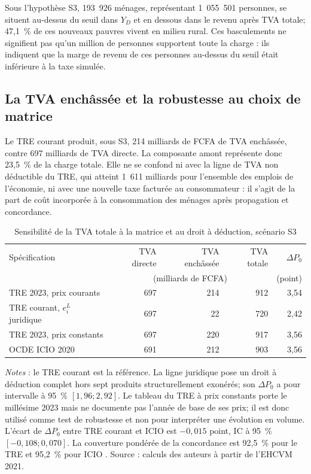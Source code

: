 \documentclass[11pt,a4paper]{article}
\begin{document}
Sous l'hypothèse S3, 193~926 ménages, représentant 1~055~501
personnes, se situent au-dessus du seuil dans $Y_D$ et en dessous dans le revenu
après TVA totale; 47,1~\% de ces nouveaux pauvres vivent en milieu rural. Ces
basculements ne signifient pas qu'un million de personnes supportent toute la
charge : ils indiquent que la marge de revenu de ces personnes au-dessus du
seuil était inférieure à la taxe simulée.

\subsection{La TVA enchâssée et la robustesse au choix de matrice}

Le TRE courant produit, sous S3, 214 milliards de FCFA de TVA enchâssée, contre
697 milliards de TVA directe. La composante amont représente donc 23,5~\% de la
charge totale. Elle ne se confond ni avec la ligne de TVA non déductible du TRE,
qui atteint 1~611 milliards pour l'ensemble des emplois de l'économie, ni avec
une nouvelle taxe facturée au consommateur : il s'agit de la part de coût
incorporée à la consommation des ménages après propagation et concordance.

\begin{table}[t]
\centering
\begin{threeparttable}
\caption{Sensibilité de la TVA totale à la matrice et au droit à déduction, scénario S3}
\label{tab:io-robustness}
\begin{tabular}{lrrrr}
\toprule
Spécification & TVA directe & TVA enchâssée & TVA totale & $\Delta P_0$ \\
        & \multicolumn{3}{c}{(milliards de FCFA)} & (point) \\
\midrule
TRE 2023, prix courants  & 697 & 214 & 912 & 3,54 \\
TRE courant, $e_i^L$ juridique & 697 & 22 & 720 & 2,42 \\
TRE 2023, prix constants & 697 & 220 & 917 & 3,56 \\
OCDE ICIO 2020           & 691 & 212 & 903 & 3,56 \\
\bottomrule
\end{tabular}
\begin{tablenotes}\footnotesize
\item \emph{Notes} : le TRE courant est la référence. La ligne juridique pose
un droit à déduction complet hors sept produits structurellement exonérés; son
$\Delta P_0$ a pour intervalle à 95~\% $[1,96;2,92]$. Le tableau du TRE à prix constants
porte le millésime 2023 mais ne documente pas l'année de base de ses prix; il
est donc utilisé comme test de robustesse et non pour interpréter une évolution
en volume. L'écart de
$\Delta P_0$ entre TRE courant et ICIO est $-0,015$ point, IC à 95~\%
$[-0,108;0,070]$. La couverture pondérée de la concordance est 92,5~\% pour le TRE et
95,2~\% pour ICIO \citep{oecd2023}. Source : calculs des auteurs à partir de l'EHCVM 2021.
\end{tablenotes}
\end{threeparttable}
\end{table}
\end{document}
